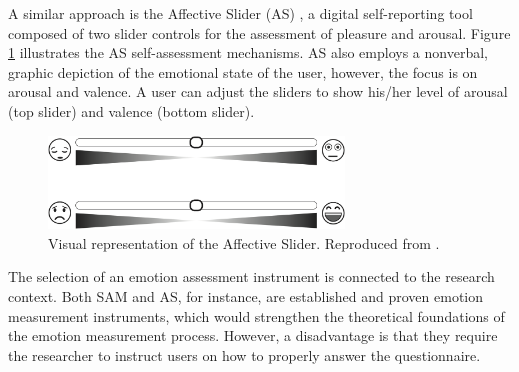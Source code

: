 A similar approach is the Affective Slider (AS) \parencite{betella2016affective}, a digital self-reporting tool composed of two slider controls for the assessment of pleasure and arousal. Figure \ref{fig:as} illustrates the AS self-assessment mechanisms. AS also employs a nonverbal, graphic depiction of the emotional state of the user, however, the focus is on arousal and valence. A user can adjust the sliders to show his/her level of arousal (top slider) and valence (bottom slider).

\begin{figure}[h]
    \centering
    \includegraphics[width=0.7\textwidth]{Content/figures/AS.png}
    \caption{Visual representation of the Affective Slider. Reproduced from \textcite{betella2016affective}.}
    \label{fig:as}
\end{figure}

The selection of an emotion assessment instrument is connected to the research context. Both SAM and AS, for instance, are established and proven emotion measurement instruments, which would strengthen the theoretical foundations of the emotion measurement process. However, a disadvantage is that they require the researcher to instruct users on how to properly answer the questionnaire.
